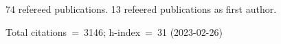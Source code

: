 74 refereed publications. 13 refeered publications as first author.

Total citations~=~3146; h-index~=~31 (2023-02-26)